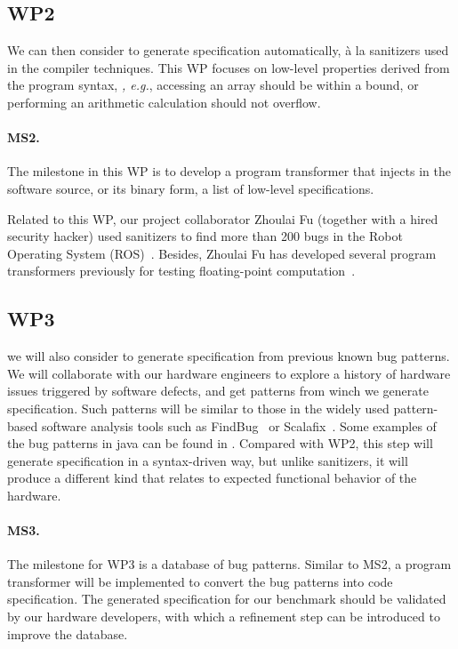 \documentclass[fleqn,12pt]{article}
\begin{document}
\subsection{WP2} 
We can then consider to generate specification automatically, \`a la
sanitizers used in the compiler techniques. This WP focuses on
low-level properties derived from the program syntax, {\em, e.g.},
accessing an array should be within a bound, or performing an
arithmetic calculation should not overflow.



\paragraph{MS2.} The milestone in this WP is to develop a program transformer
that injects in the software source, or its binary form, a list of
low-level specifications.

Related to this WP, our project collaborator Zhoulai Fu (together with
a hired security hacker) used sanitizers to find more than 200 bugs in
the Robot Operating System
(ROS)~\cite{web:ros-sanitizer-logs}. Besides, Zhoulai Fu has developed
several program transformers previously for testing floating-point
computation~\cite{DBLP:conf/pldi/FuS19,DBLP:conf/oopsla/FuBS15}.


\subsection{WP3}   we will also  consider to generate specification from  previous known bug patterns.  We will collaborate with our hardware engineers to explore a
history of hardware issues triggered by software defects, and get
patterns from winch we generate specification. Such patterns will be
similar to those in the widely used pattern-based software analysis
tools such as FindBug~\cite{DBLP:conf/paste/AyewahPMPZ07} or
Scalafix~\cite{web:scalafix}. Some examples of the bug patterns in
java can be found in \cite{web:findbugs_bugs}. Compared with WP2, this
step will  generate specification in a syntax-driven way, but
unlike sanitizers, it will produce a different kind that  relates
to expected functional behavior of the hardware.




\paragraph{MS3.} The milestone for WP3 is a database of bug patterns. Similar to MS2,
a program transformer will be implemented to convert the bug patterns
into code specification. The generated specification for our benchmark
should be validated by our hardware developers, with which a refinement
step can be introduced to improve the database.
\end{document}
